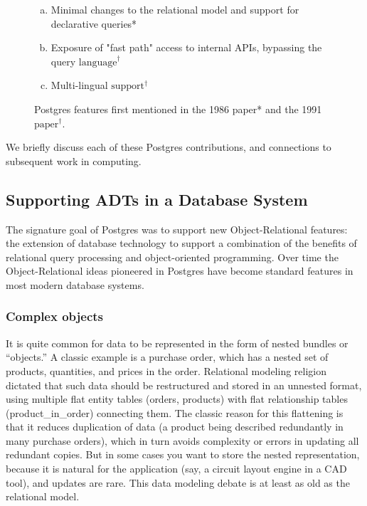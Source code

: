 \documentclass[sigconf,natbib=false]{acmart}
\begin{document}
\begin{figure}[t]
\begin{mdframed}
\begin{enumerate}[1. ]
\begin{enumerate}[a.]

\item Minimal changes to the relational model and support for declarative queries*

\item Exposure of "fast path" access to internal APIs, bypassing the query $\mbox{language}^\dagger$

\item Multi-lingual $\mbox{support}^\dagger$

\end{enumerate}
\end{enumerate}
\end{mdframed}
\caption{Postgres features first mentioned in the 1986 paper* and the 1991 $\mbox{paper}^\dagger$.}
\label{fig:features}
\end{figure}

We briefly discuss each of these Postgres contributions, and connections to subsequent work in computing.

\subsection{Supporting ADTs in a Database System}

The signature goal of Postgres was to support new Object-Relational features: the extension of database technology to support a combination of the benefits of relational query processing and object-oriented programming. Over time the Object-Relational ideas pioneered in Postgres have become standard features in most modern database systems.

\subsubsection{Complex objects}

It is quite common for data to be represented in the form of nested bundles or ``objects.'' A classic example is a purchase order, which has a nested set of products, quantities, and prices in the order. Relational modeling religion dictated that such data should be restructured and stored in an unnested format, using multiple flat entity tables (orders, products) with flat relationship tables (product\_in\_order) connecting them. The classic reason for this flattening is that it reduces duplication of data (a product being described redundantly in many purchase orders), which in turn avoids complexity or errors in updating all redundant copies. But in some cases you want to store the nested representation, because it is natural for the application (say, a circuit layout engine in a CAD tool), and updates are rare. This data modeling debate is at least as old as the relational model. 
\end{document}
